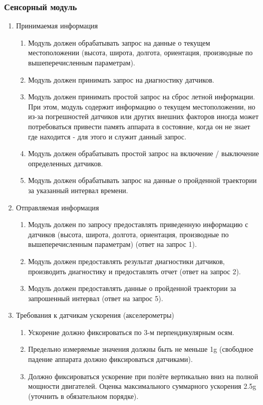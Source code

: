 \documentclass[utf8]{report}
\begin{document}
\subsubsection{Сенсорный модуль}
\begin{enumerate}
  \item Принимаемая информация
  \begin{enumerate}
    \item Модуль должен обрабатывать запрос на данные о текущем местоположении (высота, широта, долгота, ориентация, производные по вышеперечисленным параметрам).
    \item Модуль должен принимать запрос на диагностику датчиков.
    \item Модуль должен принимать простой запрос на сброс летной информации. При этом, модуль содержит информацию о текущем местоположении, но из-за погрешностей датчиков или других внешних факторов иногда может потребоваться привести память аппарата в состояние, когда он не знает где находится - для этого и служит данный запрос.
    \item Модуль должен обрабатывать простой запрос на включение / выключение определенных датчиков.
    \item Модуль должен обрабатывать запрос на данные о пройденной траектории за указанный интервал времени.
  \end{enumerate}
  \item Отправляемая информация
  \begin{enumerate}
    \item Модуль должен по запросу предоставлять приведенную информацию с датчиков (высота, широта, долгота, ориентация, производные по вышеперечисленным параметрам) (ответ на запрос 1).
    \item Модуль должен предоставлять результат диагностики датчиков, производить диагностику и предоставлять отчет (ответ на запрос 2).
    \item Модуль должен предоставлять данные о пройденной траектории за запрошенный интервал (ответ на запрос 5).
  \end{enumerate}
  \item Требования к датчикам ускорения (акселерометры)
  \begin{enumerate}
    \item Ускорение должно фиксироваться по 3-м перпендикулярным осям.
    \item Предельно измеряемые значения должны быть не меньше 1g (свободное падение аппарата должно фиксироваться датчиками).
    \item Должно фиксироваться ускорение при полёте вертикально вниз на полной мощности двигателей. Оценка максимального суммарного ускорения 2.5g (уточнить в обязательном порядке).

\end{enumerate}
\end{enumerate}
\end{document}
